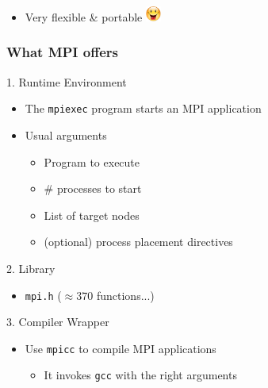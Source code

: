 \documentclass[xcolor={x11names,svgnames,psnames}]{beamer}
\newcommand{\smiley}{\includegraphics[width=0.5cm,trim=0 17mm 0 0]{content}}
\begin{document}
\begin{frame}

  \medskip
  
  \begin{itemize}
  \item Very flexible \& portable \smiley
  \end{itemize}

\end{frame}


\begin{frame}
  \frametitle{What MPI offers}

  \begin{alertblock}{1. Runtime Environment}
    \begin{itemize}
    \item The \texttt{mpiexec} program starts an MPI application
    \item Usual arguments
      \begin{itemize}
      \item Program to execute
      \item \# processes to start
      \item List of target nodes
      \item (optional) process placement directives
      \end{itemize}
    \end{itemize}
  \end{alertblock}

  \medskip
  
  \begin{exampleblock}{2. Library}
    \begin{itemize}
    \item \texttt{mpi.h} ($\approx 370$ functions...)
    \end{itemize}
  \end{exampleblock}

  \medskip

  \begin{block}{3. Compiler Wrapper}
    \begin{itemize}
    \item Use \texttt{mpicc} to compile MPI applications
      \begin{itemize}
      \item It invokes \texttt{gcc} with the right arguments 
      \end{itemize}
    \end{itemize}
  \end{block}
\end{frame}
\end{document}
